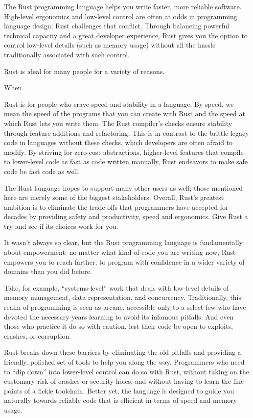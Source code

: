 The Rust programming language helps you write faster, more reliable software. High-level ergonomics and low-level control are often at odds in programming language design; Rust challenges that conflict. Through balancing powerful technical capacity and a great developer experience, Rust gives you the option to control low-level details (such as memory usage) without all the hassle traditionally associated with such control. \cite{steveklabnik2018}

Rust is ideal for many people for a variety of reasons.

When 

Rust is for people who crave speed and stability in a language. By speed, we mean the speed of the programs that you can create with Rust and the speed at which Rust lets you write them. The Rust compiler’s checks ensure stability through feature additions and refactoring. This is in contrast to the brittle legacy code in languages without these checks, which developers are often afraid to modify. By striving for zero-cost abstractions, higher-level features that compile to lower-level code as fast as code written manually, Rust endeavors to make safe code be fast code as well. \cite{steveklabnik2018}

The Rust language hopes to support many other users as well; those mentioned here are merely some of the biggest stakeholders. Overall, Rust’s greatest ambition is to eliminate the trade-offs that programmers have accepted for decades by providing safety and productivity, speed and ergonomics. Give Rust a try and see if its choices work for you. \cite{steveklabnik2018}

It wasn’t always so clear, but the Rust programming language is fundamentally about empowerment: no matter what kind of code you are writing now, Rust empowers you to reach farther, to program with confidence in a wider variety of domains than you did before.

Take, for example, “systems-level” work that deals with low-level details of memory management, data representation, and concurrency. Traditionally, this realm of programming is seen as arcane, accessible only to a select few who have devoted the necessary years learning to avoid its infamous pitfalls. And even those who practice it do so with caution, lest their code be open to exploits, crashes, or corruption.

Rust breaks down these barriers by eliminating the old pitfalls and providing a friendly, polished set of tools to help you along the way. Programmers who need to “dip down” into lower-level control can do so with Rust, without taking on the customary risk of crashes or security holes, and without having to learn the fine points of a fickle toolchain. Better yet, the language is designed to guide you naturally towards reliable code that is efficient in terms of speed and memory usage.

